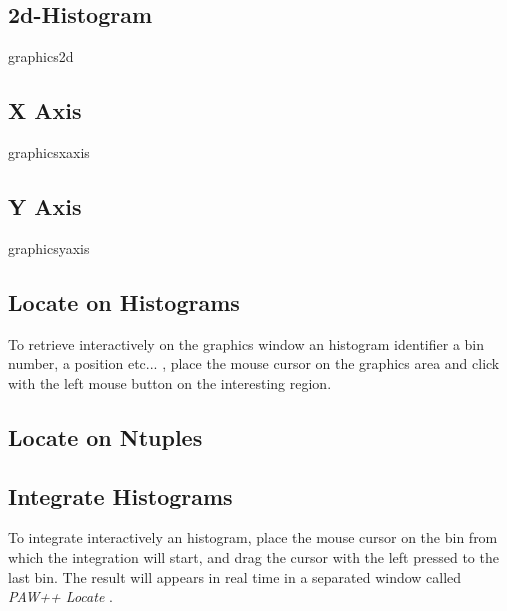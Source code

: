\newpage

\subsection{2d-Histogram}

\begin{PAWf}[.35]{graphics2d}
\end{PAWf}

\clearpage

\subsection{X Axis}

\begin{PAWf}[.4]{graphicsxaxis}
\end{PAWf}


\subsection{Y Axis}

\begin{PAWf}[.4]{graphicsyaxis}
\end{PAWf}

\clearpage

\subsection{Locate on Histograms}
To retrieve interactively on the graphics window an histogram identifier
a bin number, a  position etc... , place the mouse cursor on the
graphics area and click with the left mouse button on the interesting region.


\clearpage

\subsection{Locate on Ntuples}


\clearpage

\subsection{Integrate Histograms}
To integrate interactively an histogram, place the mouse cursor on the
bin from which the integration will start, and drag the cursor with the
left pressed to the last bin. The result will appears in real time in a
separated window called {\sl PAW++ Locate} .

